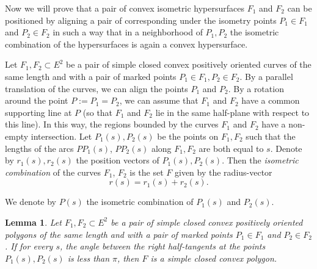 \documentclass[11pt,oneside]{amsart}
\theoremstyle{theorem}
\newtheorem{lemma}{Lemma}
\theoremstyle{definition}
\theoremstyle{remark}
\begin{document}
Now we will prove that a pair of convex isometric hypersurfaces $F_1$ and $F_2$ can be positioned by aligning a pair of corresponding under the isometry points $P_1 \in F_1$ and $P_2 \in F_2$ in such a way that in a neighborhood of $P_1, P_2$ the isometric combination of the hypersurfaces is again a convex hypersurface.  


Let $F_1, F_2 \subset E^2$ be a pair of simple closed convex positively oriented curves of the same length and with a pair of marked points $P_1 \in F_1, P_2 \in F_2$. By a parallel translation of the curves, we can align the points $P_1$ and $P_2$. By a rotation around the point $P := P_1 = P_2$, we can assume that $F_1$ and $F_2$ have a common supporting line at $P$ (so that $F_1$ and $F_2$ lie in the same half-plane with respect to this line). In this way, the regions bounded by the curves $F_1$ and $F_2$ have a non-empty intersection. Let $P_1(s), P_2(s)$ be the points on $F_1, F_2$ such that the lengths of the arcs $PP_1(s)$, $PP_2(s)$ along $F_1, F_2$ are both equal to $s$. Denote by $r_1(s), r_2(s)$ the position vectors of $P_1(s), P_2(s)$. Then the \emph{isometric combination} of the curves $F_1$, $F_2$ is the set $F$ given by the radius-vector
\[
r(s) = r_1(s) + r_2(s).
\]

We denote by $P(s)$ the isometric combination of $P_1(s)$ and $P_2(s)$.

\begin{lemma}
\label{Lem:1}
Let $F_1, F_2 \subset E^2$ be a pair of simple closed convex positively oriented polygons
of the same length and with a pair of marked points $P_1 \in F_1$ and $P_2 \in F_2$.
If for every $s$, the angle between the right half-tangents at the points $P_1(s), P_2(s)$ is less than $\pi$, then $F$ is a simple closed convex polygon.
\end{lemma}
\end{document}

